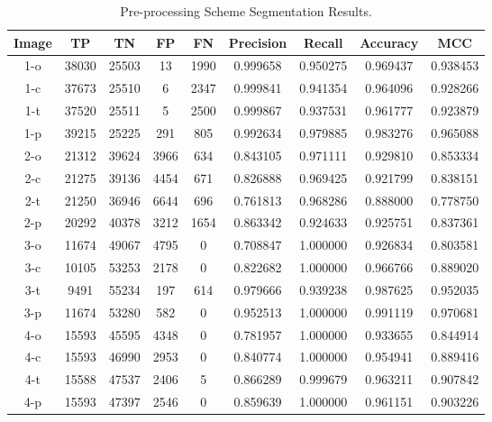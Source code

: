 \clearpage
\begin{longtable}[!h]{|c|c|c|c|c|c|c|c|c|}
	\caption{Pre-processing Scheme Segmentation Results.} \label{tab:preprocessresults}\\
	\hline	Image	&	TP	&	TN	&	FP	&	FN	&	Precision	&	Recall	&	Accuracy	&	MCC	\\
	\hline	1-o	&	38030	&	25503	&	13	&	1990	&	0.999658	&	0.950275	&	0.969437	&	0.938453	\\
	\hline	1-c	&	37673	&	25510	&	6	&	2347	&	0.999841	&	0.941354	&	0.964096	&	0.928266	\\
	\hline	\rowcolor{bad} 1-t	&	37520	&	25511	&	5	&	2500	&	0.999867	&	0.937531	&	0.961777	&	0.923879	\\
	\hline	\rowcolor{closest} 1-p	&	39215	&	25225	&	291	&	805	&	0.992634	&	0.979885	&	0.983276	&	0.965088	\\
	
	\hline \rowcolor{closest} 2-o	&	21312	&	39624	&	3966	&	634	&	0.843105	&	0.971111	&	0.929810	&	0.853334	\\
	\hline	2-c	&	21275	&	39136	&	4454	&	671	&	0.826888	&	0.969425	&	0.921799	&	0.838151	\\
	\hline	\rowcolor{bad} 2-t	&	21250	&	36946	&	6644	&	696	&	0.761813	&	0.968286	&	0.888000	&	0.778750	\\
	\hline	2-p	&	20292	&	40378	&	3212	&	1654	&	0.863342	&	0.924633	&	0.925751	&	0.837361	\\
	
	\hline	\rowcolor{bad} 3-o	&	11674	&	49067	&	4795	&	0	&	0.708847	&	1.000000	&	0.926834	&	0.803581	\\
	\hline	3-c	&	10105	&	53253	&	2178	&	0	&	0.822682	&	1.000000	&	0.966766	&	0.889020	\\
	\hline	3-t	&	9491	&	55234	&	197	&	614	&	0.979666	&	0.939238	&	0.987625	&	0.952035	\\
	\hline	\rowcolor{closest} 3-p	&	11674	&	53280	&	582	&	0	&	0.952513	&	1.000000	&	0.991119	&	0.970681	\\
	
	\hline	\rowcolor{bad} 4-o	&	15593	&	45595	&	4348	&	0	&	0.781957	&	1.000000	&	0.933655	&	0.844914	\\
	\hline	4-c	&	15593	&	46990	&	2953	&	0	&	0.840774	&	1.000000	&	0.954941	&	0.889416	\\
	\hline	\rowcolor{closest} 4-t	&	15588	&	47537	&	2406	&	5	&	0.866289	&	0.999679	&	0.963211	&	0.907842	\\
	\hline	4-p	&	15593	&	47397	&	2546	&	0	&	0.859639	&	1.000000	&	0.961151	&	0.903226	\\
	

\end{longtable}
